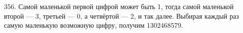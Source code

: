 356. Самой маленькой первой цифрой может быть 1, тогда самой маленькой второй --- 3, третьей --- 0, а четвёртой --- 2, и так далее. Выбирая каждый раз самую маленькую возможную цифру, получим 1302468579.\\
